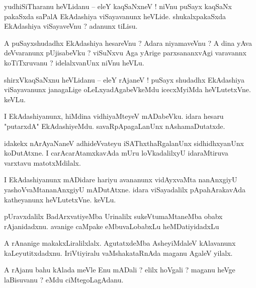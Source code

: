 \documentclass{article}
\begin{document}
\begin{mn}%
yudhiSiTharanu heVLidanu -- eleY kaqSaNxneV ! niVnu puSayx kaqSaNx pakaSxda saPalA EkAdashiya 
viSayavanunx heVLide. shukalxpakaSxda EkAdashiya viSayaveVnu ? adanunx tiLisu.
\end{mn}

\begin{mn}%
A puSayxshudadhx EkAdashiya hesareVnu ? Adara niyamaveVnu ? A dina yAva deVvaranunx pUjisabeVku ? 
viSuNxvu Aga yArige parxsananxvAgi varavannx koTiTxruvanu ? idelalxvanUnx niVnu heVLu.
\end{mn}

\begin{mn}%
shirxVkaqSaNxnu heVLidanu -- eleY rAjaneV ! puSayx shudadhx EkAdashiya viSayavanunx janagaLige 
oLeLxyadAgabeVkeMdu icecxMyiMda heVLutetxVne. keVLu.
\end{mn}

\begin{mn}%
I EkAdashiyanunx, hiMdina vidhiyaMteyeV mADabeVku. idara hesaru "putarxdA" EkAdashiyeMdu. 
savaRpApagaLanUnx nAshamaDutatxde.
\end{mn}

\begin{mn}%
idakekx nArAyaNaneV adhideVvateyu iSAThxthaRgalanUnx sidhidhxyanUnx koDutAtxne. I 
carAcarAtamxkavAda mUru loVkadalilxyU idaraMtiruva varxtavu matotxMdilalx.
\end{mn}

\begin{mn}%
I EkAdashiyanunx mADidare hariyu avananunx vidAyxvaMta nanAnxgiyU yashoVvaMtananAnxgiyU mADutAtxne. 
idara viSayadalilx pApahArakavAda katheyanunx heVLutetxVne. keVLu.
\end{mn}

\begin{mn}%
pUravxdalilx BadArxvatiyeMba Urinalilx sukeVtumaMtaneMba obabx rAjanidadxnu. avanige caMpake 
eMbuvaLobabxLu heMDatiyidadxLu
\end{mn}

\begin{mn}%
A rAnanige makakxLiralilxlalx. AgutatxdeMba AsheyiMdaleV kAlavanunx kaLeyutitxdadxnu. IriVtiyiralu 
vaMshakataRnAda maganu AgaleV yilalx.
\end{mn}

\begin{mn}%
A rAjanu bahu kAlada meVle Enu mADali ? elilx hoVgali ? maganu heVge laBisuvanu ? eMdu 
ciMtegoLagAdanu.
\end{mn}
\end{document}
